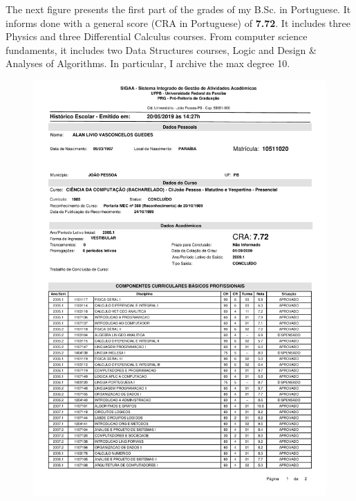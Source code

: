 \documentclass[10pt,a4paper,sans,colorlinks]{moderncv}
\begin{document}
The next figure presents the first part of the grades of my B.Sc. in Portuguese.
It informs done with a general score (CRA in Portuguese) of \textbf{7.72}.
It includes three Physics and three Differential Calculus courses.
From computer science fundaments, it includes two Data Structures courses, Logic and Design \& Analyses of Algorithms. In particular, I archive the max degree 10.
\vspace{2em}
\begin{figure}
    \centering
    \includegraphics[align=t,width=\textwidth,height=0.6\paperheight, keepaspectratio=true, trim=0cm 0cm 0cm 2cm]{certificates/bsc-grades.pdf}
\end{figure}

\newpage
\end{document}
